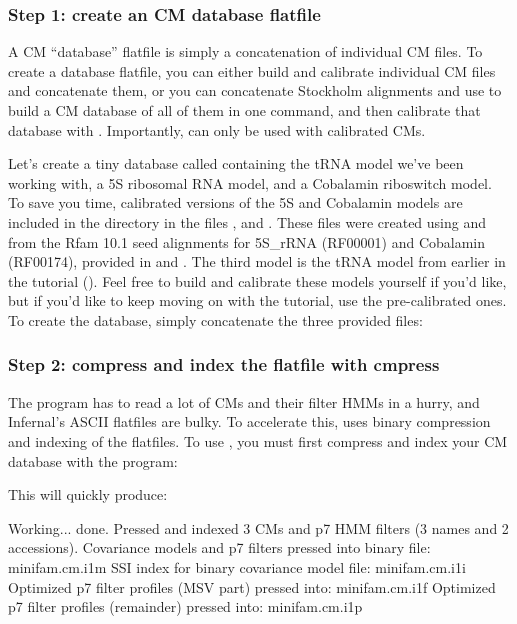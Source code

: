 \subsubsection{Step 1: create an CM database flatfile}

A CM ``database'' flatfile is simply a concatenation of individual CM
files. To create a database flatfile, you can either build and
calibrate individual CM files and concatenate them, or you can
concatenate Stockholm alignments and use  to build a CM
database of all of them in one command, and then calibrate that
database with . Importantly,  can only
be used with calibrated CMs.

Let's create a tiny database called  containing the
tRNA model we've been working with, a 5S ribosomal RNA model, and a
Cobalamin riboswitch model. To save you time, calibrated versions of
the 5S and Cobalamin models are included in the 
directory in the files , and
. These files were created using 
and  from the Rfam 10.1 seed alignments for 5S\_rRNA
(RF00001) and Cobalamin (RF00174), provided in
 and . The
third model is the tRNA model from earlier in the tutorial 
(). Feel free to build and calibrate these
models yourself if you'd like, but if you'd like to keep moving on
with the tutorial, use the pre-calibrated ones. To create the database,
simply concatenate the three provided files:


\subsubsection{Step 2: compress and index the flatfile with cmpress}

The  program has to read a lot of CMs and their filter
HMMs in a hurry, and Infernal's ASCII flatfiles are bulky. To
accelerate this,  uses binary compression and indexing of
the flatfiles. To use , you must first compress and
index your CM database with the  program:


This will quickly produce:

\begin{sreoutput}
Working...    done.
Pressed and indexed 3 CMs and p7 HMM filters (3 names and 2 accessions).
Covariance models and p7 filters pressed into binary file:  minifam.cm.i1m
SSI index for binary covariance model file:                 minifam.cm.i1i
Optimized p7 filter profiles (MSV part)  pressed into:      minifam.cm.i1f
Optimized p7 filter profiles (remainder) pressed into:      minifam.cm.i1p
\end{sreoutput}

